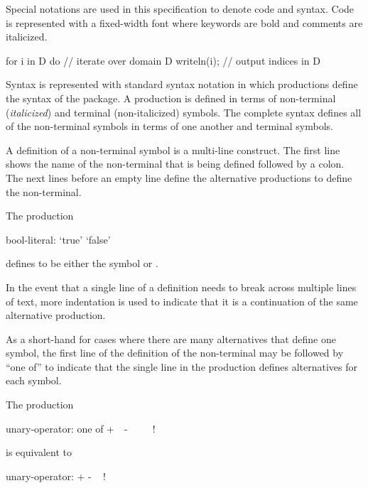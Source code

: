 \label{Notation}

Special notations are used in this specification to denote code and syntax.  
Code is represented with a fixed-width font where keywords are
bold and comments are italicized.
\begin{example}
\begin{chapel}
for i in D do   // iterate over domain D
  writeln(i);   // output indices in D
\end{chapel}
\end{example}

Syntax is represented with standard syntax notation in which
productions define the syntax of the package.  A production is
defined in terms of non-terminal ({\it italicized}) and terminal
(non-italicized) symbols.  The complete syntax defines all of the
non-terminal symbols in terms of one another and terminal symbols.

A definition of a non-terminal symbol is a multi-line construct.  The
first line shows the name of the non-terminal that is being defined
followed by a colon.  The next lines before an empty line define the
alternative productions to define the non-terminal.
\begin{example}
The production
\begin{syntax_donotcollect}
bool-literal:
  `true'
  `false'
\end{syntax_donotcollect}
defines  to be either the symbol  or
.
\end{example}
In the event that a single line of a definition needs to break across
multiple lines of text, more indentation is used to indicate that it
is a continuation of the same alternative production.

As a short-hand for cases where there are many alternatives that
define one symbol, the first line of the definition of the
non-terminal may be followed by ``one of'' to indicate that the single
line in the production defines alternatives for each symbol.
\begin{example}
The production
\begin{syntax_donotcollect}
unary-operator: one of
  + $ $ $ $ - $ $ $ $ ~ $ $ $ $ !
\end{syntax_donotcollect}
is equivalent to
\begin{syntax_donotcollect}
unary-operator:
  +
  -
  ~
  !
\end{syntax_donotcollect}
\end{example}

